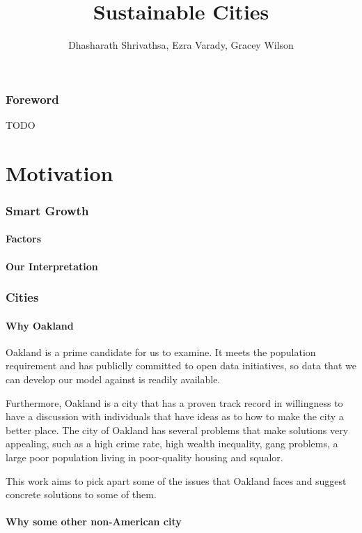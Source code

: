 \documentclass[]{report}
\title{Sustainable Cities}
\author{Dhasharath Shrivathsa, Ezra Varady, Gracey Wilson}
\begin{document}
\maketitle
\tableofcontents

\begin{abstract}
	
\end{abstract}
\section{Foreword}
TODO
\part{Motivation}
	\section{Smart Growth}
		\subsection{Factors}
		\subsection{Our Interpretation}
	
	\section{Cities}
		\subsection{Why Oakland}
		Oakland is a prime candidate for us to examine. It meets the population requirement and has publiclly committed to open data initiatives, so data that we can develop our model against is readily available.
		
		Furthermore, Oakland is a city that has a proven track record in willingness to have a discussion with individuals that have ideas as to how to make the city a better place. The city of Oakland has several problems that make solutions very appealing, such as a high crime rate, high wealth inequality, gang problems, a large poor population living in poor-quality housing and squalor.
		
		This work aims to pick apart some of the issues that Oakland faces and suggest concrete solutions to some of them.
		\subsection{Why some other non-American city}
\end{document}
